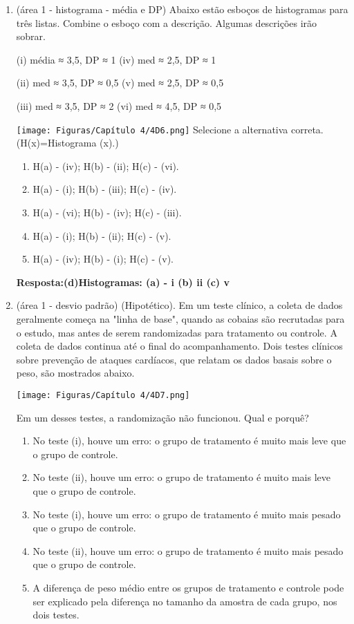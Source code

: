 \documentclass[12pt]{article}\documentclass[brazilian,12pt,a4paper,final]{article}
\begin{document}
\begin{enumerate}
\textbf{Respostas:(e) (i) 1, já que todos os desvios da média de 50 são ±1.
(ii) 2 (iii) 2 (iv) 2 (v) 10}

\item (área 1 - histograma - média e DP) Abaixo estão esboços de histogramas para três listas. Combine o esboço com a descrição. Algumas descrições irão sobrar.

(i) média ≈ 3,5, DP ≈ 1 \hspace{2,5cm}  (iv) med ≈ 2,5, DP ≈ 1

(ii) med ≈ 3,5, DP ≈ 0,5 \hspace{2,4cm} (v) med ≈ 2,5, DP ≈ 0,5

(iii) med ≈ 3,5, DP ≈ 2 \hspace{2,6cm}  (vi) med ≈ 4,5, DP ≈ 0,5

\texttt{[image: Figuras/Capítulo 4/4D6.png]}
Selecione a alternativa correta. (H(x)=Histograma (x).)
\begin{enumerate}
    \item H(a) - (iv); H(b) - (ii); H(c) - (vi).
    \item H(a) - (i); H(b) - (iii); H(c) - (iv).
    \item H(a) - (vi); H(b) - (iv); H(c) - (iii).
    \item H(a) - (i); H(b) - (ii); H(c) - (v).
    \item H(a) - (iv); H(b) - (i); H(c) - (v).
\end{enumerate}

\textbf{Resposta:(d)Histogramas: (a) - i (b) ii (c) v}

\item (área 1 - desvio padrão) (Hipotético). Em um teste clínico, a coleta de dados geralmente começa na "linha de base", quando
as cobaias são recrutadas para o estudo, mas antes de serem randomizadas para tratamento
ou controle. A coleta de dados continua até o final do acompanhamento. Dois testes clínicos
sobre prevenção de ataques cardíacos, que relatam os dados basais sobre o peso, são mostrados abaixo. 

\texttt{[image: Figuras/Capítulo 4/4D7.png]}

Em um desses testes, a randomização não funcionou. Qual e porquê?

\begin{enumerate}
    \item No teste (i), houve um erro: o grupo de tratamento é muito mais leve que o grupo de controle.
    \item No teste (ii), houve um erro: o grupo de tratamento é muito mais leve que o grupo de controle.
    \item No teste (i), houve um erro: o grupo de tratamento é muito mais pesado que o grupo de controle.
    \item No teste (ii), houve um erro: o grupo de tratamento é muito mais pesado que o grupo de controle.
    \item A diferença de peso médio entre os grupos de tratamento e controle pode ser explicado pela diferença no tamanho da amostra de cada grupo, nos dois testes.
\end{enumerate}


\end{enumerate}
\end{document}
